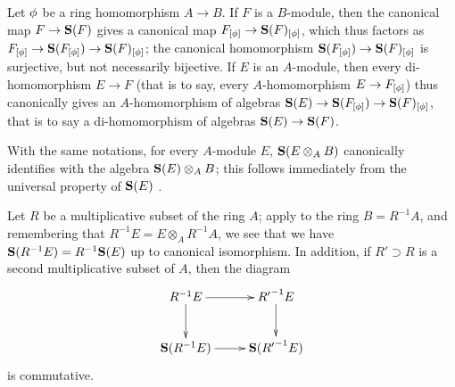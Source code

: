 \begin{env}[1.7.2]
\label{II.1.7.2}
Let $\phi$ be a ring homomorphism $A\to B$.
If $F$ is a $B$-module, then the canonical map $F\to\bb{S}(F)$ gives a canonical map $F_{[\vphi]}\to\bb{S}(F)_{[\vphi]}$, which thus factors as $F_{[\vphi]}\to\bb{S}(F_{[\vphi]})\to\bb{S}(F)_{[\vphi]}$; the canonical homomorphism $\bb{S}(F_{[\vphi]})\to\bb{S}(F)_{[\vphi]}$ is surjective, but not necessarily bijective.
If $E$ is an $A$-module, then every di-homomorphism $E\to F$ (that is to say, every $A$-homomorphism $E\to F_{[\vphi]}$) thus canonically gives an $A$-homomorphism of algebras $\bb{S}(E)\to\bb{S}(F_{[\vphi]})\to\bb{S}(F)_{[\vphi]}$, that is to say a di-homomorphism of algebras $\bb{S}(E)\to\bb{S}(F)$.

With the same notations, for every $A$-module $E$, $\mathbf{S}(E\otimes_A B)$ canonically identifies with the algebra $\mathbf{S}(E)\otimes_A B$; this follows immediately from the universal property of $\mathbf{S}(E)$ .
\end{env}

\begin{env}[1.7.3]
\label{II.1.7.3}
Let $R$ be a multiplicative subset of the ring $A$; apply  to the ring $B=R^{-1}A$, and remembering that $R^{-1}E=E\otimes_A R^{-1}A$, we see that we have $\mathbf{S}(R^{-1}E)=R^{-1}\mathbf{S}(E)$ up to canonical isomorphism.
In addition, if $R'\supset R$ is a second multiplicative subset of $A$, then the diagram
\[
  \xymatrix{
    {R^{-1}E}\ar[r]\ar[d] & {{R'}^{-1}E}\ar[d]\\
    {\bb{S}(R^{-1}E)}\ar[r] & {\bb{S}({R'}^{-1}E)}
  }
\]
is commutative.
\end{env}

